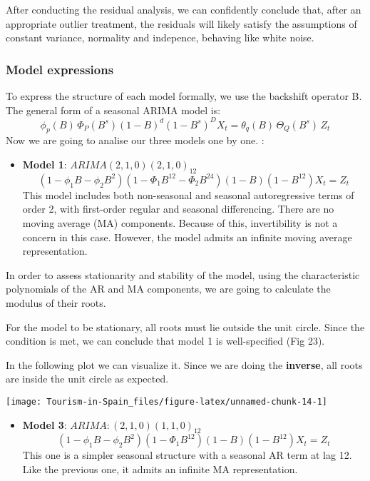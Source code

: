 \documentclass[
]{article}
\providecommand{\tightlist}{%
  \setlength{\itemsep}{0pt}\setlength{\parskip}{0pt}}
\begin{document}
After conducting the residual analysis, we can confidently conclude
that, after an appropriate outlier treatment, the residuals will likely
satisfy the assumptions of constant variance, normality and indepence,
behaving like white noise.

\hypertarget{model-expressions}{%
\subsubsection{Model expressions}\label{model-expressions}}

To express the structure of each model formally, we use the backshift
operator B. The general form of a seasonal ARIMA model is: \[
\phi_{p}(B)\, \Phi_{P}(B^s)(1 - B)^d(1 - B^s)^D X_t = \theta_{q}(B)\, \Theta_{Q}(B^s)\, Z_t
\] Now we are going to analise our three models one by one. :

\begin{itemize}
\tightlist
\item
  \textbf{Model 1}: \(ARIMA(2, 1, 0)(2, 1, 0)_{12}\)
  \[(1 - \phi_{1}B - \phi_{2}B^2)(1 - \Phi_{1}B^{12} - \Phi_{2}B^{24})(1 - B)(1 - B^{12})X_t = Z_t\]
  This model includes both non-seasonal and seasonal autoregressive
  terms of order 2, with first-order regular and seasonal differencing.
  There are no moving average (MA) components. Because of this,
  invertibility is not a concern in this case. However, the model admits
  an infinite moving average representation.
\end{itemize}

In order to assess stationarity and stability of the model, using the
characteristic polynomials of the AR and MA components, we are going to
calculate the modulus of their roots.

For the model to be stationary, all roots must lie outside the unit
circle. Since the condition is met, we can conclude that model 1 is
well-specified (Fig 23).

In the following plot we can visualize it. Since we are doing the
\textbf{inverse}, all roots are inside the unit circle as expected.

\begin{center}\texttt{[image: Tourism-in-Spain\_files/figure-latex/unnamed-chunk-14-1]} \end{center}

\begin{itemize}
\tightlist
\item
  \textbf{Model 3}: \(ARIMA: (2, 1, 0)(1, 1, 0)_{12}\)
  \[(1 - \phi_{1}B - \phi_{2}B^2)(1 - \Phi_{1}B^{12})(1 - B)(1 - B^{12})X_t = Z_t\]
  This one is a simpler seasonal structure with a seasonal AR term at
  lag 12. Like the previous one, it admits an infinite MA
  representation.
\end{itemize}
\end{document}
